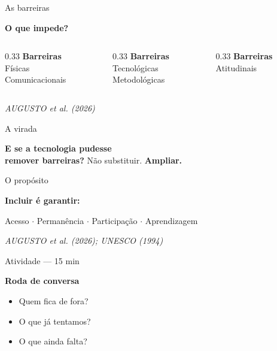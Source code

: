 \documentclass[11pt]{beamer}
\newcommand{\citabnt}[1]{%
	\vfill
	\begin{flushright}
		\tiny\textit{#1}
	\end{flushright}
}
\begin{document}
	\begin{frame}{As barreiras}
		\begin{center}
			\Large \textbf{O que impede?}
		\end{center}
		\vspace{1.5em}
		\begin{columns}[T]
			\begin{column}{0.33\textwidth}
				\centering
				\textbf{Barreiras}\\[0.3em]
				Físicas\\ Comunicacionais
			\end{column}
			\begin{column}{0.33\textwidth}
				\centering
				\textbf{Barreiras}\\[0.3em]
				Tecnológicas\\ Metodológicas
			\end{column}
			\begin{column}{0.33\textwidth}
				\centering
				\textbf{Barreiras}\\[0.3em]
				Atitudinais
			\end{column}
		\end{columns}
		\citabnt{AUGUSTO et al. (2026)}
	\end{frame}
	
	\begin{frame}{A virada}
		\begin{center}
			\Large
			\textbf{E se a tecnologia pudesse}\\
			\textbf{remover barreiras?}
			\vspace{1em}
			\normalsize
			Não substituir. \textbf{Ampliar.}
		\end{center}
	\end{frame}
	
	\begin{frame}{O propósito}
		\begin{center}
			\Large \textbf{Incluir é garantir:}
		\end{center}
		\vspace{1.5em}
		\begin{center}
			\Large
			Acesso $\cdot$ Permanência $\cdot$ Participação $\cdot$ Aprendizagem
		\end{center}
		\citabnt{AUGUSTO et al. (2026); UNESCO (1994)}
	\end{frame}
	
	\begin{frame}{Atividade — 15 min}
		\begin{center}
			\Large \textbf{Roda de conversa}
		\end{center}
		\vspace{1.5em}
		\begin{itemize}
			\item Quem fica de fora?
			\item O que já tentamos?
			\item O que ainda falta?
		\end{itemize}
	\end{frame}
	
\end{document}
